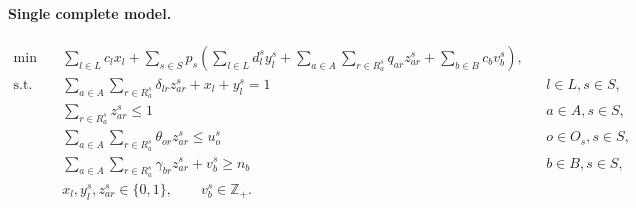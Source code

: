 \documentclass[11pt]{article}
\begin{document}
\paragraph{Single complete model.}
\begin{align}
\min\quad &\sum_{l\in L}c_lx_l+
 \sum_{s\in S}p_s\left(\sum_{l\in L}d_l^s y_l^s+
 \sum_{a\in A}\sum_{r\in R_a^s}q_{ar}z_{ar}^s+
 \sum_{b\in B}c_bv_b^s\right),\tag{1}\\
\text{s.t.}\quad &\sum_{a\in A}\sum_{r\in R_a^s}\delta_{lr}z_{ar}^s+x_l+y_l^s=1
 &&l\in L,s\in S,\tag{2}\\
&\sum_{r\in R_a^s}z_{ar}^s\le1 &&a\in A,s\in S,\tag{3}\\
&\sum_{a\in A}\sum_{r\in R_a^s}\theta_{or}z_{ar}^s\le u_o^s
 &&o\in O_s,s\in S,\tag{4}\\
&\sum_{a\in A}\sum_{r\in R_a^s}\gamma_{br}z_{ar}^s+v_b^s\ge n_b
 &&b\in B,s\in S,\tag{5}\\
&x_l,y_l^s,z_{ar}^s\in\{0,1\},\qquad v_b^s\in\mathbb Z_+.
\end{align}
\end{document}
